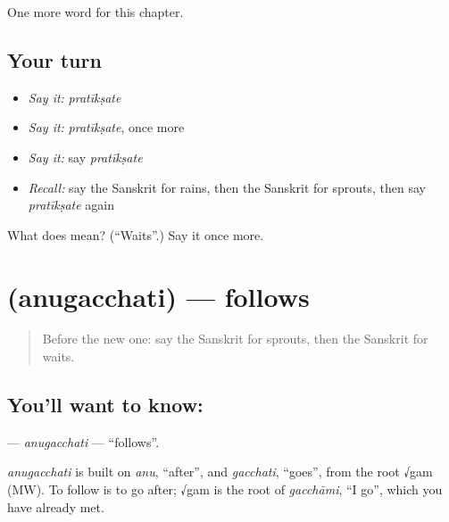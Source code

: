 \begin{grammarlens}[title={What you've built}]
One more word for this chapter.
\end{grammarlens}

\subsection*{Your turn}
\begin{itemize}
\raggedright
  \item \emph{Say it:} \emph{pratīkṣate}
  \item \emph{Say it:} \emph{pratīkṣate}, once more
  \item \emph{Say it:} say \emph{pratīkṣate}
  \item \emph{Recall:} say the Sanskrit for rains, then the Sanskrit for sprouts, then say \emph{pratīkṣate} again
\end{itemize}

\begin{tcolorbox}[breakable,colback=teal!4,colframe=teal!35!black,title={Before you move on}]
What does  mean? (\textquotedblleft{}Waits\textquotedblright{}.) Say it once more.
\end{tcolorbox}
\section[\texorpdfstring{\sk{अनुगच्छति} (anugacchati)}{अनुगच्छति (anugacchati)}]{ (anugacchati) — follows}

\label{lesson:SA-C233-anugacchati}



\begin{quote}
Before the new one: say the Sanskrit for sprouts, then the Sanskrit for waits.
\end{quote}

\subsection*{You'll want to know: }
\textbf{} — \emph{anugacchati} — \textquotedblleft{}follows\textquotedblright{}.

\begin{cousinweb}
\emph{anugacchati} is built on \emph{anu}, \textquotedblleft{}after\textquotedblright{}, and \emph{gacchati}, \textquotedblleft{}goes\textquotedblright{}, from the root √gam (MW). To follow is to go after; √gam is the root of \emph{gacchāmi}, \textquotedblleft{}I go\textquotedblright{}, which you have already met.
\end{cousinweb}

